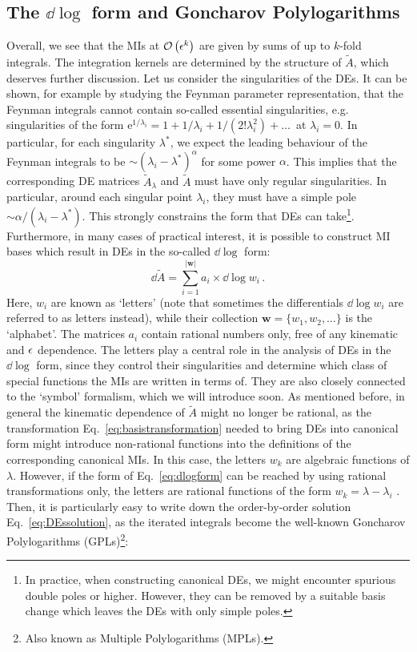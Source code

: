 \documentclass[main.tex]{subfiles}
\begin{document}
\subsection{The $\dd \log$ form and Goncharov Polylogarithms} \label{sec:DEdlogform}
Overall, we see that the MIs at $\mathcal{O}\left(\epsilon^k\right)$ are given by sums of up to $k$-fold integrals. The integration kernels are determined by the structure of $\tilde{A}$, which deserves further discussion. Let us consider the singularities of the DEs. It can be shown, for example by studying the Feynman parameter representation, that the Feynman integrals cannot contain so-called essential singularities, e.g. singularities of the form $\mathrm{e}^{1/\lambda_i} = 1+ 1/\lambda_i + 1/(2!\lambda_i^2)+\ldots\,$ at $\lambda_i=0$. In particular, for each singularity $\lambda^\ast$, we expect the leading behaviour of the Feynman integrals to be $\sim (\lambda_i- \lambda^\ast)^\alpha$ for some power $\alpha$. This implies that the corresponding DE matrices $\tilde{A}_\lambda$ and $\tilde{A}$ must have only regular singularities. In particular, around each singular point $\lambda_i$, they must have a simple pole $\sim \alpha/(\lambda_i-\lambda^\ast)$. This strongly constrains the form that DEs can take\footnote{In practice, when constructing canonical DEs, we might encounter spurious double poles or higher. However, they can be removed by a suitable basis change which leaves the DEs with only simple poles. }\cite{Henn:2014qga}. Furthermore, in many cases of practical interest, it is possible to construct MI bases which result in DEs in the so-called $\dd \log$ form:
\begin{equation} \label{eq:dlogform}
    \dd\tilde{A} = \sum_{i=1}^{|\bm{w}|} a_i \times \dd \log w_i\,.
\end{equation}
Here, $w_i$ are known as `letters' (note that sometimes the differentials $\dd \log w_i$ are referred to as letters instead), while their collection $\bm{w} = \{w_1, w_2, \ldots\}$ is the `alphabet'. The matrices $a_i$ contain rational numbers only, free of any kinematic and $\epsilon$ dependence. The letters play a central role in the analysis of DEs in the $\dd \log$ form, since they control their singularities and determine which class of special functions the MIs are written in terms of. They are also closely connected to the `symbol' formalism, which we will introduce soon. As mentioned before, in general the kinematic dependence of $\tilde{A}$ might no longer be rational, as the transformation Eq.~\ref{eq:basistransformation} needed to bring DEs into canonical form might introduce non-rational functions into the definitions of the corresponding canonical MIs. In this case, the letters $w_k$ are algebraic functions of $\lambda$. However, if the form of Eq.~\ref{eq:dlogform} can be reached by using rational transformations only, the letters are rational functions of the form $w_k = \lambda - \lambda_i$ . Then, it is particularly easy to write down the order-by-order solution Eq.~\ref{eq:DEssolution}, as the iterated integrals become the well-known Goncharov Polylogarithms (GPLs)\footnote{Also known as Multiple Polylogarithms (MPLs).}\cite{2001math......3059G, 2011arXiv1105.2076G, Vollinga:2004sn}:
\end{document}
